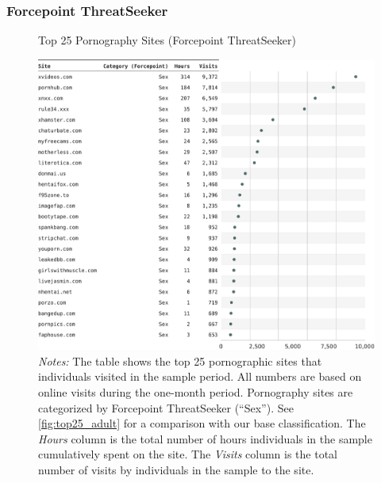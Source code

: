 \documentclass[12pt,twoside]{article}
\begin{document}
\subsubsection{Forcepoint ThreatSeeker}
\begin{figure}[!ht]
	\centering
	\caption{Top 25 Pornography Sites (Forcepoint ThreatSeeker)}
	\includegraphics[width=\textwidth]{figs/top_25_adultsites_forcepoint_threatseeker.pdf}
	\caption*{\footnotesize \emph{Notes:} 
		The table shows the top 25 pornographic sites that individuals visited in the sample period.
            All numbers are based on online visits during the one-month period.
		Pornography sites are categorized by Forcepoint ThreatSeeker (``Sex'').
            See \cref{fig:top25_adult} for a comparison with our base classification.
    	The \emph{Hours} column is the total number of hours individuals in the sample cumulatively spent on the site. 
    	The \emph{Visits} column is the total number of visits by individuals in the sample to the site.            
	}
	\label{fig:top25_adult_forcepoint}
\end{figure}





\end{document}

